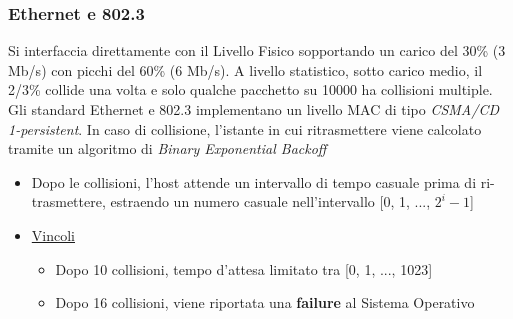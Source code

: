 \documentclass{article}
\begin{document}
            \subsubsection{Ethernet e 802.3}
                Si interfaccia direttamente con il Livello Fisico sopportando un carico del 30\% (3 Mb/s) con picchi del 60\% (6 Mb/s). A livello statistico, sotto carico medio, il 2/3\% collide una volta e solo qualche pacchetto su 10000 ha collisioni multiple.\\
                Gli standard Ethernet e 802.3 implementano un livello MAC di tipo \textit{CSMA/CD 1-persistent}. In caso di collisione, l'istante in cui ritrasmettere viene calcolato tramite un algoritmo di \textit{Binary Exponential Backoff}
                \begin{itemize}
                    \item Dopo le collisioni, l'host attende un intervallo di tempo casuale prima di ri-trasmettere, estraendo un numero casuale nell'intervallo [0, 1, ..., $ 2^i - 1 $]
                    \item \underline{Vincoli}
                          \begin{itemize}
                              \item Dopo 10 collisioni, tempo d'attesa limitato tra [0, 1, ..., 1023]
                              \item Dopo 16 collisioni, viene riportata una \textbf{failure} al Sistema Operativo
                          \end{itemize}
                \end{itemize}
\end{document}
